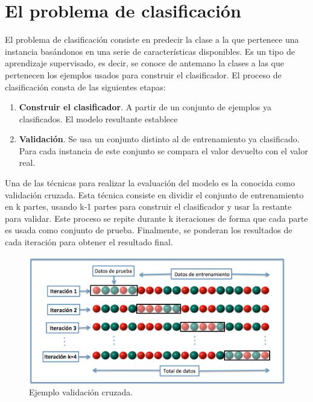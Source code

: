 \chapter{El problema de clasificación}\label{aped.F}
El problema de clasificación\cite{clasification} consiste en predecir la clase a la que pertenece una instancia basándonos en una serie de características disponibles. Es un tipo de aprendizaje supervisado, es decir, se conoce de antemano la clases a las que pertenecen los ejemplos usados para construir el clasificador.
El proceso de clasificación consta de las siguientes etapas:

\begin{enumerate}
	\item \textbf{Construir el clasificador}. A partir de un conjunto de ejemplos ya clasificados. El modelo resultante establece 
	\item \textbf{Validación}. Se usa un conjunto distinto al de entrenamiento ya clasificado. Para cada instancia de este conjunto se compara el valor devuelto con el valor real.
\end{enumerate}

Una de las técnicas para realizar la evaluación del modelo es la conocida como validación cruzada. Esta técnica consiste en dividir el conjunto de entrenamiento en k partes, usando k-1 partes para construir el clasificador y usar la restante para validar. Este proceso se repite durante k iteraciones de forma que cada parte es usada como conjunto de prueba. Finalmente, se ponderan los resultados de cada iteración para obtener el resultado final.
\begin{figure}
	\centering
	\includegraphics[scale=0.45]{img/K-fold_cross_validation.jpg}
	\caption{Ejemplo validación cruzada.}
\end{figure}

